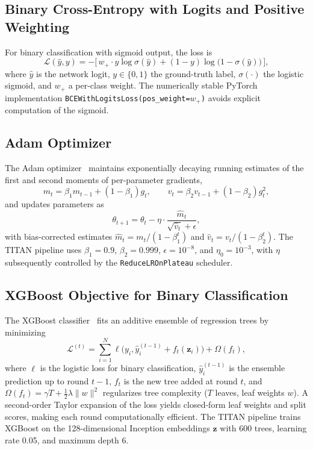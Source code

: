 \subsection{Binary Cross-Entropy with Logits and Positive Weighting}

For binary classification with sigmoid output, the loss is
\begin{equation}
\mathcal{L}(\hat{y}, y) = -\bigl[\, w_{+} \cdot y \log\sigma(\hat y) + (1 - y) \log\bigl(1 - \sigma(\hat y)\bigr)\,\bigr],
\label{eq:bce-pos}
\end{equation}
where $\hat y$ is the network logit, $y \in \{0, 1\}$ the ground-truth label, $\sigma(\cdot)$ the logistic sigmoid, and $w_{+}$ a per-class weight. The numerically stable PyTorch implementation \texttt{BCEWithLogitsLoss(pos\_weight=$w_{+}$)} avoids explicit computation of the sigmoid.

\subsection{Adam Optimizer}

The Adam optimizer~\cite{kingma2015adam} maintains exponentially decaying running estimates of the first and second moments of per-parameter gradients,
\begin{equation}
m_t = \beta_1 m_{t-1} + (1-\beta_1) g_t, \qquad v_t = \beta_2 v_{t-1} + (1-\beta_2) g_t^2,
\end{equation}
and updates parameters as
\begin{equation}
\theta_{t+1} = \theta_t - \eta \cdot \frac{\hat m_t}{\sqrt{\hat v_t} + \epsilon},
\end{equation}
with bias-corrected estimates $\hat m_t = m_t / (1 - \beta_1^t)$ and $\hat v_t = v_t / (1 - \beta_2^t)$. The TITAN pipeline uses $\beta_1 = 0.9$, $\beta_2 = 0.999$, $\epsilon = 10^{-8}$, and $\eta_0 = 10^{-3}$, with $\eta$ subsequently controlled by the \texttt{ReduceLROnPlateau} scheduler.

\subsection{XGBoost Objective for Binary Classification}

The XGBoost classifier~\cite{chen2016xgboost} fits an additive ensemble of regression trees by minimizing
\begin{equation}
\mathcal{L}^{(t)} = \sum_{i=1}^{N} \ell\bigl(y_i, \hat y_i^{(t-1)} + f_t(\mathbf{z}_i)\bigr) + \Omega(f_t),
\end{equation}
where $\ell$ is the logistic loss for binary classification, $\hat y_i^{(t-1)}$ is the ensemble prediction up to round $t-1$, $f_t$ is the new tree added at round $t$, and $\Omega(f_t) = \gamma T + \frac{1}{2} \lambda \|w\|^2$ regularizes tree complexity ($T$ leaves, leaf weights $w$). A second-order Taylor expansion of the loss yields closed-form leaf weights and split scores, making each round computationally efficient. The TITAN pipeline trains XGBoost on the 128-dimensional Inception embeddings $\mathbf{z}$ with 600 trees, learning rate 0.05, and maximum depth 6.

